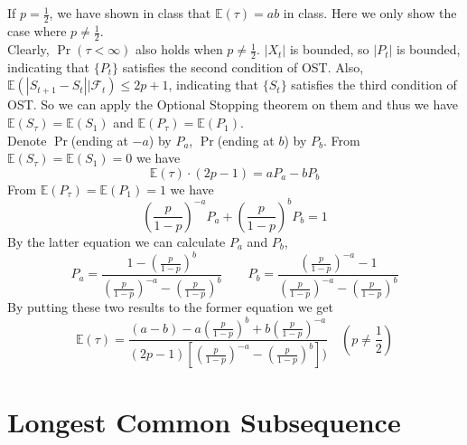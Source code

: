 \documentclass[12pt,letterpaper]{article}
\begin{document}
\subsection{}
If $p=\frac{1}{2}$, we have shown in class that $\mathbb{E}(\tau)=ab$ in class.
Here we only show the case where $p\neq\frac{1}{2}$.\\
Clearly, $\Pr(\tau<\infty)$ also holds when $p\neq\frac{1}{2}$. 
$|X_t|$ is bounded, so $|P_t|$ is bounded,
indicating that $\{P_t\}$ satisfies the second condition of OST.
Also, $\mathbb{E}(|S_{t+1}-S_{t}||\mathcal{F}_t)\leq 2p+1$,
indicating that $\{S_t\}$ satisfies the third condition of OST.
So we can apply the Optional Stopping theorem on them and thus we have
$\mathbb{E}(S_{\tau})=\mathbb{E}(S_{1})$ and $\mathbb{E}(P_{\tau})=\mathbb{E}(P_{1})$.\\
Denote $\Pr$(ending at $-a$) by $P_a$, $\Pr$(ending at $b$) by $P_b$.
From $\mathbb{E}(S_{\tau})=\mathbb{E}(S_{1})=0$ we have 
$$\mathbb{E}(\tau)\cdot(2p-1)=aP_a-bP_b$$
From $\mathbb{E}(P_{\tau})=\mathbb{E}(P_{1})=1$ we have
$$\left(\frac{p}{1-p}\right)^{-a}P_a+\left(\frac{p}{1-p}\right)^{b}P_b=1$$
By the latter equation we can calculate $P_a$ and $P_b$,
$$P_a=\frac{1-\left(\frac{p}{1-p}\right)^b}{\left(\frac{p}{1-p}\right)^{-a}-\left(\frac{p}{1-p}\right)^b}\qquad
P_b=\frac{\left(\frac{p}{1-p}\right)^{-a}-1}{\left(\frac{p}{1-p}\right)^{-a}-\left(\frac{p}{1-p}\right)^b}$$
By putting these two results to the former equation we get
$$\mathbb{E}(\tau)=\frac{(a-b)-a\left(\frac{p}{1-p}\right)^b+b\left(\frac{p}{1-p}\right)^{-a}}
{(2p-1)\left[\left(\frac{p}{1-p}\right)^{-a}-\left(\frac{p}{1-p}\right)^b\right])} \quad (p\neq\frac{1}{2})$$

\section{Longest Common Subsequence}
\end{document}
